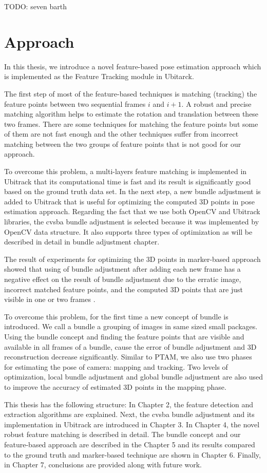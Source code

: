 TODO: seven barth


\section {Approach} \label{sec:approach}
In this thesis, we introduce a novel feature-based pose estimation approach which is implemented as the Feature Tracking module in Ubitarck. 

The first step of most of the feature-based techniques is matching (tracking) the feature points between two sequential frames $i$ and $i+1$. A robust and precise matching algorithm helps to estimate the rotation and translation between these two frames. There are some techniques for matching the feature points but some of them are not fast enough and the other techniques suffer from incorrect matching between the two groups of feature points that is not good for our approach. 

To overcome this problem, a multi-layers feature matching is implemented in Ubitrack that its computational time is fast and its result is significantly good based on the ground truth data set. In the next step, a new bundle adjustment is added to Ubitrack that is useful for optimizing the computed 3D points in pose estimation approach. Regarding the fact that we use both OpenCV and Ubitrack libraries, the cvsba bundle adjustment is selected because it was implemented by OpenCV data structure. It also supports three types of optimization as will be  described in detail in bundle adjustment chapter.

The result of experiments for optimizing the 3D points in marker-based approach showed that using of bundle adjustment after adding each new frame has a negative effect on the result of bundle adjustment due to the erratic image, incorrect matched feature points, and the computed 3D points that are just visible in one or two frames \cite{barth2014marker}.

To overcome this problem, for the first time a new concept of bundle is introduced. We call a bundle a grouping of images in same sized small packages. Using the bundle concept and finding the feature points that are visible and available in all frames of a bundle, cause the error of bundle adjustment and 3D reconstruction decrease significantly. Similar to PTAM, we also use two phases for estimating the pose of camera: mapping and tracking. Two levels of optimization, local bundle adjustment and global bundle adjustment are also used to improve the accuracy of estimated 3D points in the mapping phase.

This thesis has the following structure: In Chapter 2, the feature detection and extraction algorithms are explained. Next, the cvsba bundle adjustment and its implementation in Ubitrack are introduced in Chapter 3. In Chapter 4, the novel robust feature matching is described in detail. The bundle concept and our feature-based approach are described in the Chapter 5 and its results compared to the ground truth and marker-based technique are shown in Chapter 6. Finally, in Chapter 7, conclusions are provided along with future work.

